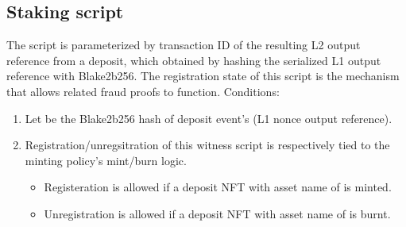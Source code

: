 \documentclass[../midgard.tex]{subfiles}
\begin{document}
\subsection{Staking script}
\label{h:deposit-staking-script}
The  script is parameterized by transaction ID of the resulting L2 output reference from a deposit, which obtained by hashing the serialized L1 output reference with Blake2b256.
The registration state of this script is the mechanism that allows related fraud proofs to function.
Conditions:

\begin{enumerate}
  \item Let  be the Blake2b256 hash of deposit event's  (L1 nonce output reference).
  \item Registration/unregsitration of this witness script is respectively tied to the  minting policy's mint/burn logic. 
    \begin{itemize}
      \item Registeration is allowed if a deposit NFT with asset name of  is minted.
      \item Unregistration is allowed if a deposit NFT with asset name of  is burnt.
    \end{itemize}
\end{enumerate}
\end{document}
